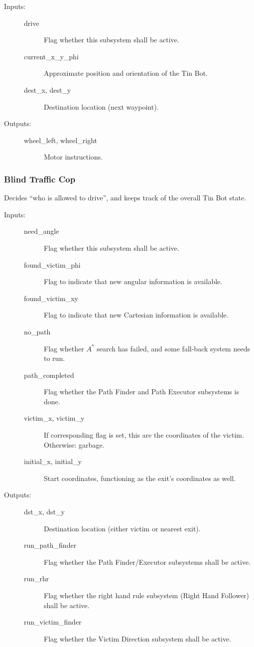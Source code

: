 \documentclass[a4paper,parskip,headheight=38pt]{scrartcl} %
\begin{document}
\begin{description}
\item[Inputs:] \hfill
    \begin{description}
    \item[drive] Flag whether this subsystem shall be active.
    \item[current\_x\_y\_phi] Approximate position and orientation of the Tin Bot.
  	\item[dest\_x, dest\_y] Destination location (next waypoint).
	\end{description}
\item[Outputs:] \hfill
	\begin{description}
	\item[wheel\_left, wheel\_right] Motor instructions.
	\end{description}
\end{description}

\subsubsection{Blind Traffic Cop}

Decides \enquote{who is allowed to drive}, and keeps track of the overall Tin Bot state.

\begin{description}
\item[Inputs:] \hfill
    \begin{description}
    \item[need\_angle] Flag whether this subsystem shall be active.
	\item[found\_victim\_phi] Flag to indicate that new angular information is available.
    \item[found\_victim\_xy] Flag to indicate that new Cartesian information is available.
    \item[no\_path] Flag whether $A^\ast$ search has failed, and some fall-back system needs to run.
    \item[path\_completed] Flag whether the Path Finder and Path Executor subsystems is done.
	\item[victim\_x, victim\_y] If corresponding flag is set, this are the coordinates of the victim.  Otherwise: garbage.
	\item[initial\_x, initial\_y] Start coordinates, functioning as the exit's coordinates as well.
	\end{description}
\item[Outputs:] \hfill
	\begin{description}
  	\item[dst\_x, dst\_y] Destination location (either victim or nearest exit).
    \item[run\_path\_finder] Flag whether the Path Finder/Executor subsystems shall be active.
	\item[run\_rhr] Flag whether the right hand rule subsystem (Right Hand Follower) shall be active.
	\item[run\_victim\_finder] Flag whether the Victim Direction subsystem shall be active.
	\end{description}
\end{description}
\end{document}
